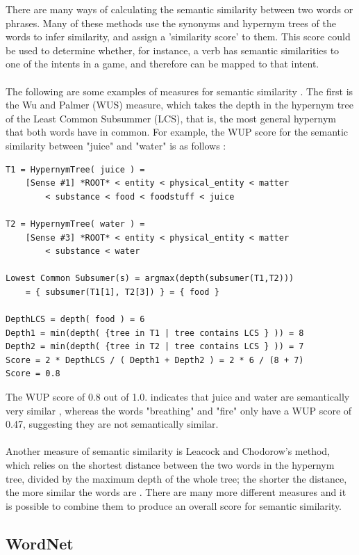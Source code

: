 \documentclass[12pt]{article}
\begin{document}
There are many ways of calculating the semantic similarity between two words or phrases. Many of these methods use the synonyms and hypernym trees of the words to infer similarity, and assign a 'similarity score' to them. This score could be used to determine whether, for instance, a verb has semantic similarities to one of the intents in a game, and therefore can be mapped to that intent.
\\
\\
The following are some examples of measures for semantic similarity \cite{RefWorks:46}. The first is the Wu and Palmer (WUS) measure, which takes the depth in the hypernym tree of the Least Common Subsummer (LCS), that is, the most general hypernym that both words have in common. For example, the WUP score for the semantic similarity between "juice" and "water" is as follows \cite{RefWorks:49}:

\begin{lstlisting}[frame=single]
T1 = HypernymTree( juice ) = 
    [Sense #1] *ROOT* < entity < physical_entity < matter
    	< substance < food < foodstuff < juice
    	
T2 = HypernymTree( water ) = 
    [Sense #3] *ROOT* < entity < physical_entity < matter
    	< substance < water
    	
Lowest Common Subsumer(s) = argmax(depth(subsumer(T1,T2)))
    = { subsumer(T1[1], T2[3]) } = { food }
    
DepthLCS = depth( food ) = 6
Depth1 = min(depth( {tree in T1 | tree contains LCS } )) = 8
Depth2 = min(depth( {tree in T2 | tree contains LCS } )) = 7
Score = 2 * DepthLCS / ( Depth1 + Depth2 ) = 2 * 6 / (8 + 7)
Score = 0.8
\end{lstlisting}

The WUP score of 0.8 out of 1.0. indicates that juice and water are semantically very similar \cite{RefWorks:47}, whereas the words "breathing" and "fire" only have a WUP score of 0.47, suggesting they are not semantically similar.
\\
\\
Another measure of semantic similarity is Leacock and Chodorow's method, which relies on the shortest distance between the two words in the hypernym tree, divided by the maximum depth of the whole tree; the shorter the distance, the more similar the words are \cite{RefWorks:46}. There are many more different measures and it is possible to combine them to produce an overall score for semantic similarity.

\subsection{WordNet}
\end{document}
